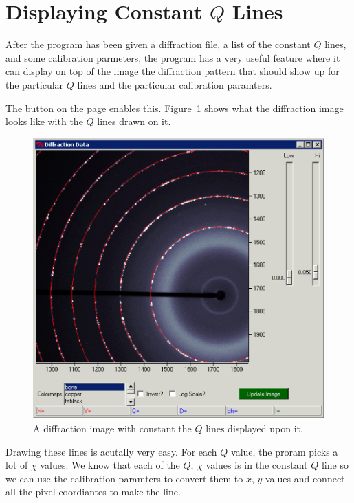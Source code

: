 \section{\texorpdfstring{Displaying Constant $Q$ 
    Lines}{Displaying Constant Q Lines}}
    \label{displayconstQlines}

After the program has been given a diffraction file,
a list of the constant $Q$ lines, and some
calibration parmeters, the program has a very
useful feature where it can display on top of
the image the diffraction pattern that should
show up for the particular $Q$ lines and the
particular calibration paramters.

The  button on the 
 page enables this.
Figure~\ref{constant_q_lines_on_diffraction_image}
shows what the diffraction image looks like with
the $Q$ lines drawn on it.

\begin{figure}
    \centering
    \includegraphics[scale=.75]{figures/constant_q_lines_on_diffraction_image.eps}
    \caption{A diffraction image with constant the $Q$
    lines displayed upon it.}
    \label{constant_q_lines_on_diffraction_image}
\end{figure}

Drawing these lines is acutally very easy. For
each $Q$ value, the proram picks a lot of
$\chi$ values. We know that each of the $Q$, $\chi$
values is in the constant $Q$ line so we can use
the calibration paramters to convert them to $x$, $y$
values and connect all the pixel coordiantes to 
make the line.

